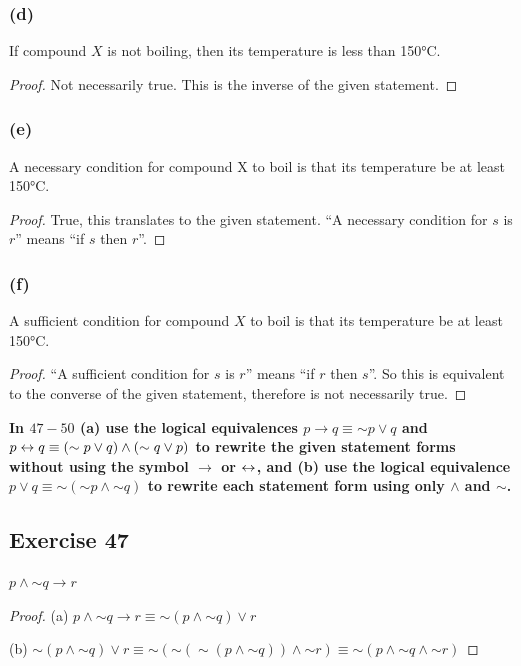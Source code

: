 \documentclass[14pt]{extarticle}
\begin{document}
\subsubsection{(d)} If compound $X$ is not boiling, then its temperature is less
than 150°C.

\begin{proof} Not necessarily true. This is the inverse of the given statement.
\end{proof}

\subsubsection{(e)} A necessary condition for compound X to boil is that its
temperature be at least 150°C.

\begin{proof} True, this translates to the given statement. ``A necessary
condition for $s$ is $r$'' means ``if $s$ then $r$''. \end{proof}

\subsubsection{(f)} A sufficient condition for compound $X$ to boil is that its
temperature be at least 150°C.

\begin{proof} ``A sufficient condition for $s$ is $r$'' means ``if $r$ then
$s$''. So this is equivalent to the converse of the given statement, therefore
is not necessarily true. \end{proof}

{\bf In $47-50$ (a) use the logical equivalences $p \to q \equiv {\sim p} \vee
q$ and $p \leftrightarrow q \equiv ({\sim p} \vee q) \wedge ({\sim q} \vee p)$ to rewrite
the given statement forms without using the symbol $\to$ or $\leftrightarrow$, and (b) use
the logical equivalence $p \vee q \equiv {\sim({\sim p} \wedge {\sim q})}$ to
rewrite each statement form using only $\wedge$ and $\sim$.}

\subsection{Exercise 47} $p \wedge {\sim q} \to r$
\begin{proof} (a) $p \wedge {\sim q} \to r \equiv {\sim(p \wedge {\sim q})} \vee
r$

(b) ${\sim(p \wedge {\sim q})} \vee r \equiv {\sim ({\sim ({\sim(p \wedge {\sim
q})})} \wedge {\sim r})} \equiv {\sim (p \wedge {\sim q} \wedge {\sim r})}$
\end{proof}
\end{document}

